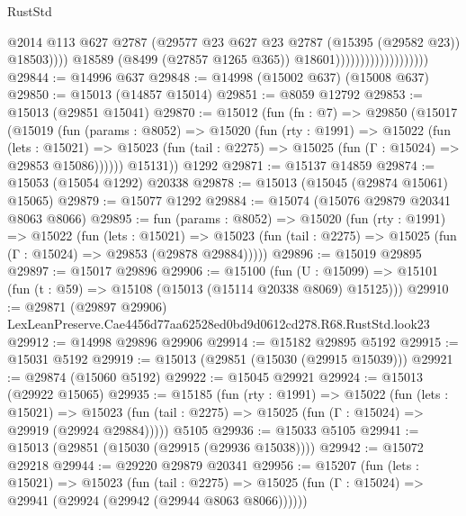 \begin{lexlean}{RustStd}
\begin{coremodule}
                                                @2014
                                                @113
                                                @627
                                                @2787
                                                (@29577
                                                  @23
                                                  @627
                                                  @23
                                                  @2787
                                                  (@15395 (@29582 @23))
                                                  @18503))))
                                          @18589
                                          (@8499 (@27857 @1265 @365))
                                          @18601)))))))))))))))))))
@29844 := @14996 @637
@29848 := @14998 (@15002 @637) (@15008 @637)
@29850 := @15013 (@14857 @15014)
@29851 := @8059 @12792
@29853 := @15013 (@29851 @15041)
@29870 := @15012
    (fun (fn : @7) =>
    @29850
      (@15017
        (@15019
          (fun (params : @8052) =>
          @15020
            (fun (rty : @1991) =>
            @15022
              (fun (lets : @15021) =>
              @15023 (fun (tail : @2275) => @15025 (fun (Γ : @15024) => @29853 @15086))))))
        @15131))
    @1292
@29871 := @15137 @14859
@29874 := @15053 (@15054 @1292) @20338
@29878 := @15013 (@15045 (@29874 @15061) @15065)
@29879 := @15077 @1292
@29884 := @15074 (@15076 @29879 @20341 @8063 @8066)
@29895 := fun (params : @8052) =>
  @15020
    (fun (rty : @1991) =>
    @15022
      (fun (lets : @15021) =>
      @15023 (fun (tail : @2275) => @15025 (fun (Γ : @15024) => @29853 (@29878 @29884)))))
@29896 := @15019 @29895
@29897 := @15017 @29896
@29906 := @15100
    (fun (U : @15099) => @15101 (fun (t : @59) => @15108 (@15013 (@15114 @20338 @8069) @15125)))
@29910 := @29871
    (@29897 @29906)
    LexLeanPreserve.Cae4456d77aa62528ed0bd9d0612cd278.R68.RustStd.look23
@29912 := @14998 @29896 @29906
@29914 := @15182 @29895 @5192
@29915 := @15031 @5192
@29919 := @15013 (@29851 (@15030 (@29915 @15039)))
@29921 := @29874 (@15060 @5192)
@29922 := @15045 @29921
@29924 := @15013 (@29922 @15065)
@29935 := @15185
    (fun (rty : @1991) =>
    @15022
      (fun (lets : @15021) =>
      @15023 (fun (tail : @2275) => @15025 (fun (Γ : @15024) => @29919 (@29924 @29884)))))
    @5105
@29936 := @15033 @5105
@29941 := @15013 (@29851 (@15030 (@29915 (@29936 @15038))))
@29942 := @15072 @29218
@29944 := @29220 @29879 @20341
@29956 := @15207
    (fun (lets : @15021) =>
    @15023
      (fun (tail : @2275) =>
      @15025 (fun (Γ : @15024) => @29941 (@29924 (@29942 (@29944 @8063 @8066))))))

\end{coremodule}
\end{lexlean}
